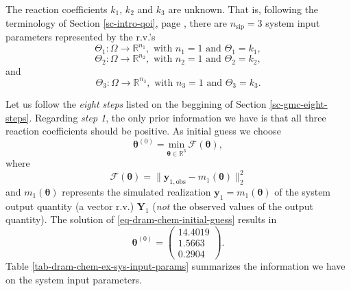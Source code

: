 The reaction coefficients $k_1$, $k_2$ and $k_3$ are unknown.
That is,
following the terminology of Section \ref{sc-intro-qoi}, page \pageref{sc-intro-qoi},
there are $n_{\text{sip}}=3$ system input parameters
represented by the r.v.'s
\begin{equation*}
\Theta_1:\Omega\rightarrow\mathbb{R}^{n_1},\text{ with }n_1=1\text{ and }\Theta_1=k_1,
\end{equation*}
\begin{equation*}
\Theta_2:\Omega\rightarrow\mathbb{R}^{n_2},\text{ with }n_2=1\text{ and }\Theta_2=k_2,
\end{equation*}
and
\begin{equation*}
\Theta_3:\Omega\rightarrow\mathbb{R}^{n_3},\text{ with }n_3=1\text{ and }\Theta_3=k_3.
\end{equation*}

Let us follow the {\it eight steps} listed on the beggining of Section \ref{sc-gmc-eight-steps}.
Regarding {\it step 1},
the only prior information we have is that all three reaction coefficients should be positive.
As initial guess we choose
\begin{equation}\label{eq-dram-chem-initial-guess}
\boldsymbol{\theta}^{(0)} = \underset{\boldsymbol{\theta}\in\mathbb{R}^3}{\text{min}}~\mathcal{F}(\boldsymbol{\theta}),
\end{equation}
where
\begin{equation*}
\mathcal{F}(\boldsymbol{\theta}) = \|\mathbf{y}_{1,\text{obs}}-m_1(\boldsymbol{\theta})\|_2^2
\end{equation*}
and $m_1(\boldsymbol{\theta})$ represents the simulated realization $\mathbf{y}_1=m_1(\boldsymbol{\theta})$ of the system output quantity (a vector r.v.) $\mathbf{Y}_1$ ({\it not} the observed values of the output quantity).
The solution of \eqref{eq-dram-chem-initial-guess} results in
\begin{equation*}
\boldsymbol{\theta}^{(0)}
=
\left(
\begin{array}{c}
14.4019 \\
 1.5663 \\
 0.2904
\end{array}
\right).
\end{equation*}
Table \ref{tab-dram-chem-ex-sys-input-params} summarizes the information we have on the system input parameters.

